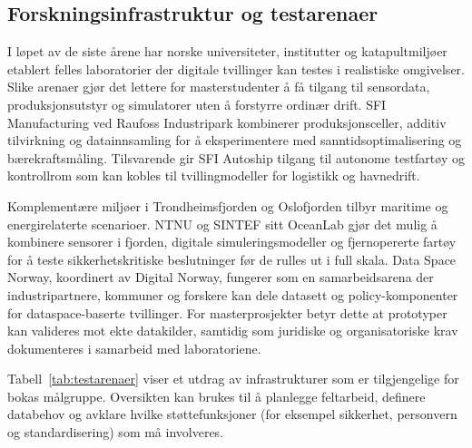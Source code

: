 \subsection{Forskningsinfrastruktur og testarenaer}
I løpet av de siste årene har norske universiteter, institutter og katapultmiljøer etablert felles laboratorier der digitale tvillinger kan testes i realistiske omgivelser. Slike arenaer gjør det lettere for masterstudenter å få tilgang til sensordata, produksjonsutstyr og simulatorer uten å forstyrre ordinær drift. SFI Manufacturing ved Raufoss Industripark kombinerer produksjonsceller, additiv tilvirkning og datainnsamling for å eksperimentere med sanntidsoptimalisering og bærekraftsmåling.\citep{sfi_manufacturing2023} Tilsvarende gir SFI Autoship tilgang til autonome testfartøy og kontrollrom som kan kobles til tvillingmodeller for logistikk og havnedrift.\citep{sfi_autoship2023}

Komplementære miljøer i Trondheimsfjorden og Oslofjorden tilbyr maritime og energirelaterte scenarioer. NTNU og SINTEF sitt OceanLab gjør det mulig å kombinere sensorer i fjorden, digitale simuleringsmodeller og fjernopererte fartøy for å teste sikkerhetskritiske beslutninger før de rulles ut i full skala.\citep{sintef2024oceanlab} Data Space Norway, koordinert av Digital Norway, fungerer som en samarbeidsarena der industripartnere, kommuner og forskere kan dele datasett og policy-komponenter for dataspace-baserte tvillinger.\citep{digitalnorway2024dataspace} For masterprosjekter betyr dette at prototyper kan valideres mot ekte datakilder, samtidig som juridiske og organisatoriske krav dokumenteres i samarbeid med laboratoriene.

Tabell~\ref{tab:testarenaer} viser et utdrag av infrastrukturer som er tilgjengelige for bokas målgruppe. Oversikten kan brukes til å planlegge feltarbeid, definere databehov og avklare hvilke støttefunksjoner (for eksempel sikkerhet, personvern og standardisering) som må involveres.

